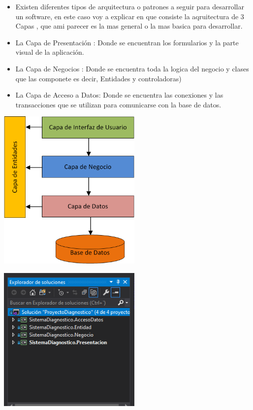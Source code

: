 \documentclass[preprint,12pt]{elsarticle}
\begin{document}
\begin{itemize}
\item Existen diferentes tipos de arquitectura o patrones a seguir para desarrollar un software, en este caso voy a explicar en que consiste la aqruitectura de 3 Capas , que ami parecer es la mas general o la mas basica para desarrollar.
	\item La Capa de Presentación : Donde se encuentran los formularios y la parte visual de la aplicación.
	\item 	La Capa de Negocios  : Donde se encuentra toda la logica del negocio y clases que las componete es decir, Entidades y controladoras)

	\item 	La Capa de Acceso a Datos: Donde se encuentra las conexiones y las transacciones que se utilizan para comunicarse con la base de datos.
	\end{itemize}
	\begin{center}
	\includegraphics[width=7cm]{./imagen/23} 
	\end{center}
	\begin{center}
\includegraphics[width=7cm]{./imagen/4capas} 
	\end{center}
\end{document}
